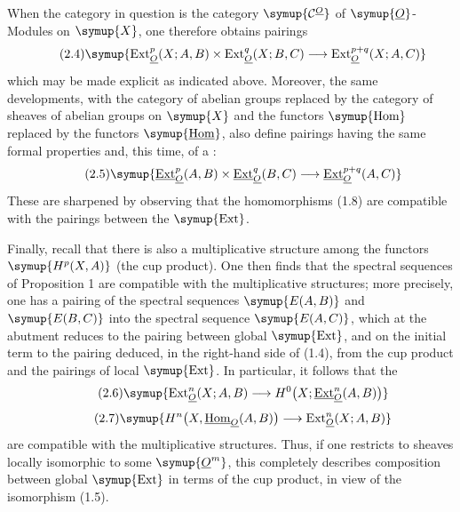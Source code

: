 When the category in question is the category $\symup{\Ccat^{\Osh}}$ of
$\symup{\Osh}$-Modules on $\symup{X}$, one therefore obtains pairings
\begin{equation}\tag{2.4}
  \symup{\operatorname{Ext}_{\Osh}^{p}(X;A,B)
  \times\operatorname{Ext}_{\Osh}^{q}(X;B,C)
  \longrightarrow\operatorname{Ext}_{\Osh}^{p+q}(X;A,C)}
\end{equation}
which may be made explicit as indicated above. Moreover, the same developments,
with the category of abelian groups replaced by the category of sheaves of
abelian groups on $\symup{X}$ and the functors $\symup{\operatorname{Hom}}$ replaced by the
functors $\symup{\Homsh}$, also define pairings having the same formal properties and,
this time, of a :
\begin{equation}\tag{2.5}
  \symup{\Extsh_{\Osh}^{p}(A,B)\times\Extsh_{\Osh}^{q}(B,C)
  \longrightarrow\Extsh_{\Osh}^{p+q}(A,C)}
\end{equation}
These are sharpened by observing that the homomorphisms (1.8) are compatible
with the pairings between the $\symup{\operatorname{Ext}}$.

Finally, recall that there is also a multiplicative structure among the functors
$\symup{H^{p}(X,A)}$ (the cup product). One then finds that the spectral sequences of
Proposition 1 are compatible with the multiplicative structures; more
precisely, one has a pairing of the spectral sequences $\symup{E(A,B)}$ and $\symup{E(B,C)}$
into the spectral sequence $\symup{E(A,C)}$, which at the abutment reduces to the pairing
between global $\symup{\operatorname{Ext}}$, and on the initial term to the
pairing deduced, in the right-hand side of (1.4), from the cup product and the
pairings of local $\symup{\operatorname{Ext}}$. In particular, it follows that
the 
\begin{equation}\tag{2.6}
  \symup{\operatorname{Ext}_{\Osh}^{n}(X;A,B)
  \longrightarrow H^{0}\bigl(X;\Extsh_{\Osh}^{n}(A,B)\bigr)}
\end{equation}
\begin{equation}\tag{2.7}
  \symup{H^{n}\bigl(X,\Homsh_{\Osh}(A,B)\bigr)
  \longrightarrow\operatorname{Ext}_{\Osh}^{n}(X;A,B)}
\end{equation}
are compatible with the multiplicative structures. Thus, if one restricts to
sheaves locally isomorphic to some $\symup{\Osh^{m}}$, this completely describes
composition between global $\symup{\operatorname{Ext}}$ in terms of the cup
product, in view of the isomorphism (1.5).


